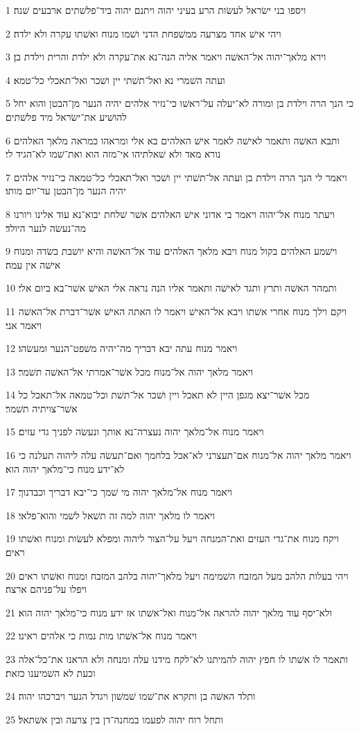 \par 1 ויספו בני ישׂראל לעשׂות הרע בעיני יהוה ויתנם יהוה ביד־פלשׁתים ארבעים שׁנה׃
\par 2 ויהי אישׁ אחד מצרעה ממשׁפחת הדני ושׁמו מנוח ואשׁתו עקרה ולא ילדה׃
\par 3 וירא מלאך־יהוה אל־האשׁה ויאמר אליה הנה־נא את־עקרה ולא ילדת והרית וילדת בן׃
\par 4 ועתה השׁמרי נא ואל־תשׁתי יין ושׁכר ואל־תאכלי כל־טמא׃
\par 5 כי הנך הרה וילדת בן ומורה לא־יעלה על־ראשׁו כי־נזיר אלהים יהיה הנער מן־הבטן והוא יחל להושׁיע את־ישׂראל מיד פלשׁתים׃
\par 6 ותבא האשׁה ותאמר לאישׁה לאמר אישׁ האלהים בא אלי ומראהו כמראה מלאך האלהים נורא מאד ולא שׁאלתיהו אי־מזה הוא ואת־שׁמו לא־הגיד לי׃
\par 7 ויאמר לי הנך הרה וילדת בן ועתה אל־תשׁתי יין ושׁכר ואל־תאכלי כל־טמאה כי־נזיר אלהים יהיה הנער מן־הבטן עד־יום מותו׃
\par 8 ויעתר מנוח אל־יהוה ויאמר בי אדוני אישׁ האלהים אשׁר שׁלחת יבוא־נא עוד אלינו ויורנו מה־נעשׂה לנער היולד׃
\par 9 וישׁמע האלהים בקול מנוח ויבא מלאך האלהים עוד אל־האשׁה והיא יושׁבת בשׂדה ומנוח אישׁה אין עמה׃
\par 10 ותמהר האשׁה ותרץ ותגד לאישׁה ותאמר אליו הנה נראה אלי האישׁ אשׁר־בא ביום אלי׃
\par 11 ויקם וילך מנוח אחרי אשׁתו ויבא אל־האישׁ ויאמר לו האתה האישׁ אשׁר־דברת אל־האשׁה ויאמר אני׃
\par 12 ויאמר מנוח עתה יבא דבריך מה־יהיה משׁפט־הנער ומעשׂהו׃
\par 13 ויאמר מלאך יהוה אל־מנוח מכל אשׁר־אמרתי אל־האשׁה תשׁמר׃
\par 14 מכל אשׁר־יצא מגפן היין לא תאכל ויין ושׁכר אל־תשׁת וכל־טמאה אל־תאכל כל אשׁר־צויתיה תשׁמר׃
\par 15 ויאמר מנוח אל־מלאך יהוה נעצרה־נא אותך ונעשׂה לפניך גדי עזים׃
\par 16 ויאמר מלאך יהוה אל־מנוח אם־תעצרני לא־אכל בלחמך ואם־תעשׂה עלה ליהוה תעלנה כי לא־ידע מנוח כי־מלאך יהוה הוא׃
\par 17 ויאמר מנוח אל־מלאך יהוה מי שׁמך כי־יבא דבריך וכבדנוך׃
\par 18 ויאמר לו מלאך יהוה למה זה תשׁאל לשׁמי והוא־פלאי׃
\par 19 ויקח מנוח את־גדי העזים ואת־המנחה ויעל על־הצור ליהוה ומפלא לעשׂות ומנוח ואשׁתו ראים׃
\par 20 ויהי בעלות הלהב מעל המזבח השׁמימה ויעל מלאך־יהוה בלהב המזבח ומנוח ואשׁתו ראים ויפלו על־פניהם ארצה׃
\par 21 ולא־יסף עוד מלאך יהוה להראה אל־מנוח ואל־אשׁתו אז ידע מנוח כי־מלאך יהוה הוא׃
\par 22 ויאמר מנוח אל־אשׁתו מות נמות כי אלהים ראינו׃
\par 23 ותאמר לו אשׁתו לו חפץ יהוה להמיתנו לא־לקח מידנו עלה ומנחה ולא הראנו את־כל־אלה וכעת לא השׁמיענו כזאת׃
\par 24 ותלד האשׁה בן ותקרא את־שׁמו שׁמשׁון ויגדל הנער ויברכהו יהוה׃
\par 25 ותחל רוח יהוה לפעמו במחנה־דן בין צרעה ובין אשׁתאל׃


